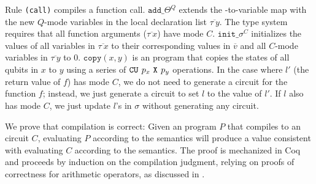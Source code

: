 Rule \texttt{(call)} compiles a function call.
$\texttt{add\_}\Theta^Q$ extends the \vqimp-to-\vqir variable map with the new $Q$-mode variables in the local declaration list $\overline{\tau~y}$.
The \vqimp type system requires that all function arguments ($\overline{\tau~x}$) have mode $C$. 
$\texttt{init\_}\sigma^C$ initializes the values of all variables in $\overline{\tau~x}$ to their corresponding values in $\overline{v}$ and all $C$-mode variables in $\overline{\tau~y}$ to 0.
$\texttt{copy}(x,y)$ is an \vqir program that copies the states of all qubits in $x$ to $y$ using a series of $\texttt{CU}^{ }~{p_x}~{\texttt{X}^{ }~{p_y}}$ operations. 
In the case where $l'$ (the return value of $f$) has mode $C$, we do not need to generate a circuit for the function $f$; instead, we just generate a circuit to set $l$ to the value of $l'$.
If $l$ also has mode $C$, we just update $l$'s in $\sigma$ without generating any circuit.


We prove that compilation is correct: Given an \vqimp program $P$ that compiles to an \oqasm circuit $C$, evaluating $P$ according to the \vqimp semantics will produce a value consistent with evaluating $C$ according to the \oqasm semantics. 
The proof is mechanized in Coq and proceeds by
induction on the compilation judgment, relying on proofs of
correctness for \vqir arithmetic operators, as discussed in
.
